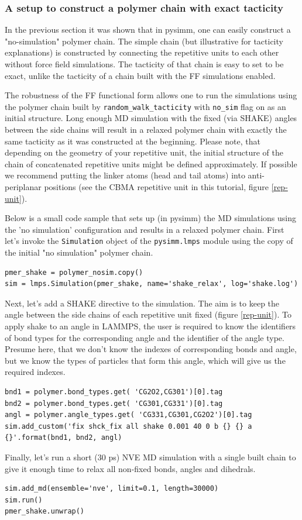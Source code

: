 \documentclass[9pt,tutorial]{livecoms}
\begin{document}
\subsubsection{A setup to construct a polymer chain with exact tacticity}

In the previous section it was shown that in pysimm, one can easily construct a "no-simulation" polymer chain. The simple chain (but illustrative for tacticity explanations) is constructed by connecting the repetitive units to each other without force field simulations. The tacticity of that chain is easy to set to be exact, unlike the tacticity of a chain built with the FF simulations enabled.

The robustness of the FF functional form allows one to run the simulations using the polymer chain built by \lstinline$random_walk_tacticity$ with \lstinline$no_sim$ flag on as an initial structure. Long enough MD simulation with the fixed (via SHAKE) angles between the side chains will result in a relaxed polymer chain with exactly the same tacticity as it was constructed at the beginning. Please note, that depending on the geometry of your repetitive unit, the initial structure of the chain of concatenated repetitive units might be defined approximately. If possible we recommend putting the linker atoms (head and tail atoms) into anti-periplanar positions (see the CBMA repetitive unit in this tutorial, figure \ref{rep-unit}).

Below is a small code sample that sets up (in pysimm) the MD simulations using the 'no simulation' configuration and results in a relaxed polymer chain. First let's invoke the \lstinline$Simulation$ object of the \lstinline$pysimm.lmps$ module using the copy of the initial "no simulation" polymer chain.
\begin{lstlisting}
pmer_shake = polymer_nosim.copy()
sim = lmps.Simulation(pmer_shake, name='shake_relax', log='shake.log')
\end{lstlisting}

Next, let's add a SHAKE directive to the simulation. The aim is to keep the angle between the side chains of each repetitive unit fixed (figure \ref{rep-unit}). To apply shake to an angle in LAMMPS, the user is required to know the identifiers of bond types for the corresponding angle and the identifier of the angle type. Presume here, that we don't know the indexes of corresponding bonds and angle, but we know the types of particles that form this angle, which will give us the required indexes. 
\begin{lstlisting}
bnd1 = polymer.bond_types.get( 'CG2O2,CG301')[0].tag
bnd2 = polymer.bond_types.get( 'CG301,CG331')[0].tag
angl = polymer.angle_types.get( 'CG331,CG301,CG2O2')[0].tag
sim.add_custom('fix shck_fix all shake 0.001 40 0 b {} {} a {}'.format(bnd1, bnd2, angl)
\end{lstlisting}
Finally, let's run a short (30 ps) NVE MD simulation with a single built chain to give it enough time to relax all non-fixed bonds, angles and dihedrals.
\begin{lstlisting}
sim.add_md(ensemble='nve', limit=0.1, length=30000)
sim.run()
pmer_shake.unwrap()
\end{lstlisting}
\end{document}
